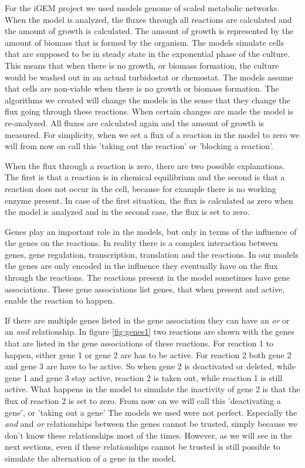 \documentclass[12pt]{report}
\begin{document}
For the iGEM project we used models genome of scaled metabolic networks. When the model is analyzed, the fluxes through all reactions are calculated and the amount of growth is calculated. The amount of growth is represented by the amount of biomass that is formed by the organism. The models simulate cells that are supposed to be in steady state in the exponential phase of the culture. This means that when there is no growth, or biomass formation, the culture would be washed out in an actual turbidostat or chemostat. The models assume that cells are non-viable when there is no growth or biomass formation. The algorithms we created will change the models in the sense that they change the flux going through these reactions. When certain changes are made the model is re-analyzed. All fluxes are calculated again and the amount of growth is measured. For simplicity, when we set a flux of a reaction in the model to zero we will from now on call this 'taking out the reaction' or 'blocking a reaction'.

When the flux through a reaction is zero, there are two possible explanations. The first is that a reaction is in chemical equilibrium and the second is that a reaction does not occur in the cell, because for example there is no working enzyme present. In case of the first situation, the flux is calculated as zero when the model is analyzed and in the second case, the flux is set to zero.

Genes play an important role in the models, but only in terms of the influence of the genes on the reactions.
In reality there is a complex interaction between genes, gene regulation, transcription, translation and the reactions.
In our models the genes are only encoded in the influence they eventually have on the flux through the reactions.
The reactions present in the model sometimes have gene associations.
These gene associations list genes, that when present and active, enable the reaction to happen.

If there are multiple genes listed in the gene association they can have an \emph{or} or an \emph{and} relationship.
In figure \ref{fig:genes1}  two reactions are shown with the genes that are listed in the gene associations of these reactions.
For reaction 1 to happen, either gene 1 or gene 2 are has to be active. For reaction 2 both gene 2 and gene 3 are have to be active. So when gene 2 is deactivated or deleted, while gene 1 and gene 3 stay active, reaction 2 is taken out, while reaction 1 is still active. What happens in the model to simulate the inactivity of gene 2 is that the flux of reaction 2 is set to zero. From now on we will call this 'deactivating a gene', or 'taking out a gene'
The models we used were not perfect. Especially the \emph{and} and \emph{or} relationships between the genes cannot be trusted, simply because we don't know these relationships most of the times.
However, as we will see in the next sections, even if these relationships cannot be trusted is still possible to simulate the alternation of a gene in the model.
\end{document}

